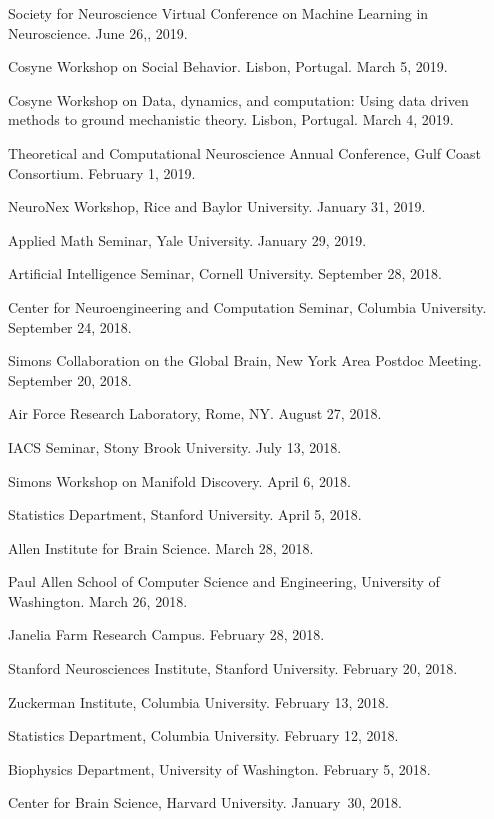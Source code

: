 \documentclass[10pt]{article}
\begin{document}
\begin{outerlist}
\item Society for Neuroscience Virtual Conference on Machine Learning in Neuroscience. June 26,, 2019.  
\item Cosyne Workshop on Social Behavior. Lisbon, Portugal. March 5, 2019.
\item Cosyne Workshop on Data, dynamics, and computation: Using data driven methods to ground mechanistic theory. Lisbon, Portugal. March 4, 2019.  
\item Theoretical and Computational Neuroscience Annual Conference, Gulf Coast Consortium. February 1, 2019.  
\item NeuroNex Workshop, Rice and Baylor University. January 31, 2019.  
\item Applied Math Seminar, Yale University. January 29, 2019.  
\item Artificial Intelligence Seminar, Cornell University. September 28, 2018.  
\item Center for Neuroengineering and Computation Seminar, Columbia University. September 24, 2018.  
\item Simons Collaboration on the Global Brain, New York Area Postdoc Meeting. September 20, 2018.  
\item Air Force Research Laboratory, Rome, NY. August 27, 2018.
\item IACS Seminar, Stony Brook University. July 13, 2018.  
\item Simons Workshop on Manifold Discovery. April 6, 2018.  
\item Statistics Department, Stanford University. April 5, 2018.
\item Allen Institute for Brain Science. March 28, 2018.  
\item Paul Allen School of Computer Science and Engineering, University of Washington. March 26, 2018.
\item Janelia Farm Research Campus. February 28, 2018.
\item Stanford Neurosciences Institute, Stanford University. February 20, 2018.
\item Zuckerman Institute, Columbia University. February 13, 2018.
\item Statistics Department, Columbia University. February 12, 2018.
\item Biophysics Department, University of Washington. February 5, 2018.
\item Center for Brain Science, Harvard University. January~30, 2018.

\end{outerlist}
\end{document}
